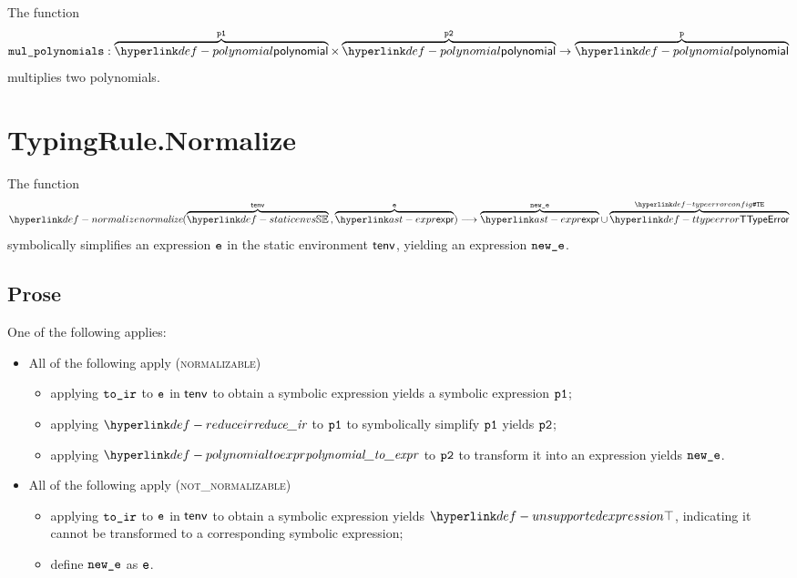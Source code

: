The function
\[
  \mulpolynomials : \overname{\polynomial}{\vpone} \times \overname{\polynomial}{\vptwo} \rightarrow \overname{\polynomial}{\vp}
\]
multiplies two polynomials.
\begin{mathpar}
\end{mathpar}

\section{TypingRule.Normalize \label{sec:TypingRule.Normalize}}
\hypertarget{def-normalize}{}
The function
\[
\normalize(\overname{\staticenvs}{\tenv} \aslsep \overname{\expr}{\ve}) \aslto \overname{\expr}{\newe} \cup \overname{\TTypeError}{\TypeErrorConfig}
\]
\hypertarget{def-symbolicallysimplifies}{symbolically simplifies} an expression $\ve$ in the static environment $\tenv$,
yielding an expression $\newe$.
\ProseOtherwiseTypeError

\subsection{Prose}
One of the following applies:
\begin{itemize}
  \item All of the following apply (\textsc{normalizable})
  \begin{itemize}
    \item applying $\toir$ to $\ve$ in $\tenv$ to obtain a symbolic expression yields a symbolic expression $\vpone$\ProseOrTypeError;
    \item applying $\reduceir$ to $\vpone$ to symbolically simplify $\vpone$ yields $\vptwo$;
    \item applying $\polynomialtoexpr$ to $\vptwo$ to transform it into an expression yields $\newe$.
  \end{itemize}

  \item All of the following apply (\textsc{not\_normalizable})
  \begin{itemize}
    \item applying $\toir$ to $\ve$ in $\tenv$ to obtain a symbolic expression yields $\CannotBeTransformed$,
          indicating it cannot be transformed to a corresponding symbolic expression;
    \item define $\newe$ as $\ve$.
  \end{itemize}
\end{itemize}
